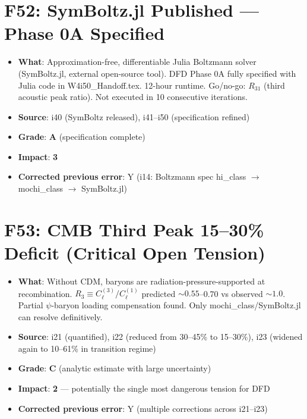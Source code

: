 \documentclass[11pt,a4paper]{article}
\newcommand{\grade}[1]{\textbf{#1}}
\newcommand{\impact}[1]{\textbf{#1}}
\begin{document}
\section{F52: SymBoltz.jl Published --- Phase 0A Specified}
\begin{itemize}[nosep]
\item \textbf{What}: Approximation-free, differentiable Julia Boltzmann solver (SymBoltz.jl, external open-source tool). DFD Phase 0A fully specified with Julia code in W4i50\_Handoff.tex. 12-hour runtime. Go/no-go: $R_{31}$ (third acoustic peak ratio). Not executed in 10 consecutive iterations.
\item \textbf{Source}: i40 (SymBoltz released), i41--i50 (specification refined)
\item \textbf{Grade}: \grade{A} (specification complete)
\item \textbf{Impact}: \impact{3}
\item \textbf{Corrected previous error}: Y (i14: Boltzmann spec hi\_class $\to$ mochi\_class $\to$ SymBoltz.jl)
\end{itemize}

\section{F53: CMB Third Peak 15--30\% Deficit (Critical Open Tension)}
\begin{itemize}[nosep]
\item \textbf{What}: Without CDM, baryons are radiation-pressure-supported at recombination. $R_3 \equiv C_\ell^{(3)}/C_\ell^{(1)}$ predicted $\sim 0.55$--0.70 vs observed $\sim 1.0$. Partial $\psi$-baryon loading compensation found. Only mochi\_class/SymBoltz.jl can resolve definitively.
\item \textbf{Source}: i21 (quantified), i22 (reduced from 30--45\% to 15--30\%), i23 (widened again to 10--61\% in transition regime)
\item \textbf{Grade}: \grade{C} (analytic estimate with large uncertainty)
\item \textbf{Impact}: \impact{2} --- potentially the single most dangerous tension for DFD
\item \textbf{Corrected previous error}: Y (multiple corrections across i21--i23)
\end{itemize}
\end{document}
